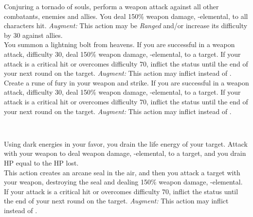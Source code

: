 \begin{tabjob}
         Conjuring a tornado of souls, perform a weapon attack against all other combatants, enemies and allies. You deal 150\% weapon damage, -elemental, to all characters hit. \textit{Augment:} This action may be \textit{Ranged} and/or increase its difficulty by 30 against allies.\\
       
         You summon a lightning bolt from heavens. If you are successful in a weapon attack, difficulty 30, deal 150\% weapon damage, -elemental, to a target. If your attack is a critical hit or overcomes difficulty 70, inflict the  status until the end of your next round on the target. \textit{Augment:} This action may inflict  instead of .\\

         Create a rune of fury in your weapon and strike. If you are successful in a weapon attack, difficulty 30, deal 150\% weapon damage, -elemental, to a target. If your attack is a critical hit or overcomes difficulty 70, inflict the  status until the end of your next round on the target. \textit{Augment:} This action may inflict  instead of .\\

    \tabjobsep%

    \\
    \tabjobspec{}

         Using dark energies in your favor, you drain the life energy of your target. Attack with your weapon to deal weapon damage, -elemental, to a target, and you drain HP equal to the HP lost\@. \\

         This action creates an arcane seal in the air, and then you attack a target with your weapon, destroying the seal and dealing 150\% weapon damage, -elemental. If your attack is a critical hit or overcomes difficulty 70, inflict the  status until the end of your next round on the target. \textit{Augment:} This action may inflict  instead of .\\


\end{tabjob}
